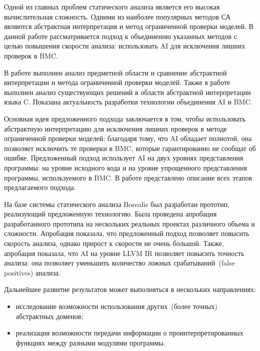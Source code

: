 \conclusion
Одной из главных проблем статического анализа является его высокая 
вычислительная сложность. Одними из наиболее популярных методов СА являются абстрактная интерпретация и метод ограниченной проверки моделей.
В данной работе рассматривается подход к объединению указанных методов с целью
повышения скорости анализа: использовать AI для исключения лишних проверок в BMC.

В работе выполнен анализ предметной области и сравнение абстрактной интерпретации
и метода ограниченной проверки моделей. Также в работе выполнен анализ 
существующих решений в области абстрактной интерпретации языка C. Показана 
актуальность разработки технологии объединения AI и BMC.

Основная идея предложенного подхода заключается в том, чтобы использовать 
абстрактную интерпретацию для исключения лишних проверок в методе ограниченной 
проверки моделей: благодаря тому, что AI обладает полнотой, она позволяет 
исключить те проверки в BMC, которые гарантированно не сообщат об ошибке. 
Предложенный подход использует AI на двух уровнях представления программы:
на уровне исходного кода и на уровне упрощенного представления программы, 
используемого в BMC. В работе представлено описание всех этапов предлагаемого
подхода. %

На базе системы статического анализа Borealis был разработан прототип, 
реализующий предложенную технологию. Была проведена апробация разработанного
прототипа на нескольких реальных проектах различного объема и сложности. 
Апробация показала, что предложенный подход позволяет повысить скорость анализа,
однако прирост к скорости не очень большой. Также, апробация показала, что
AI на уровне LLVM IR позволяет повысить точность анализа: она позволяет уменьшить
количество ложных срабатываний~(false positives) анализа.

Дальнейшее развитие результатов может выполняться в нескольких направлениях:
\begin{itemize}
\item исследование возможности использования других~(более точных) абстрактных
доменов;
\item реализация возможности передачи информации о проинтерпретированных функциях
между разными модулями программы.
\end{itemize}